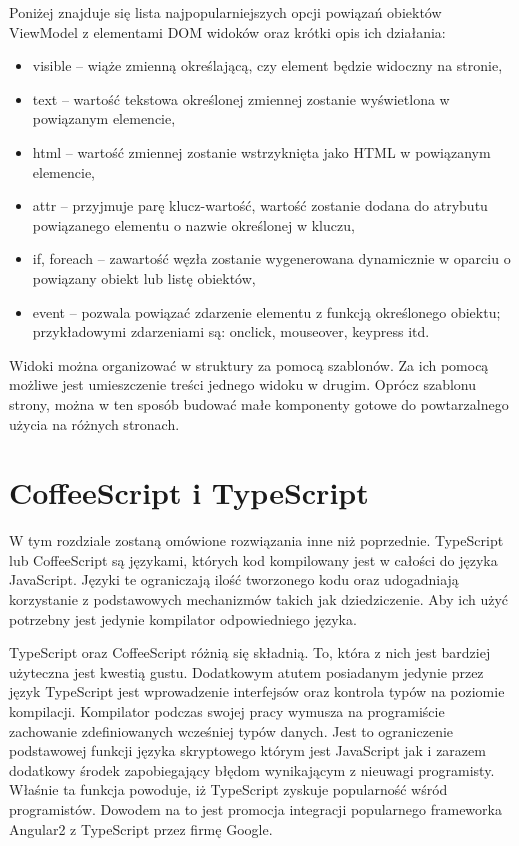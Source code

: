 Poniżej znajduje się lista najpopularniejszych opcji powiązań obiektów ViewModel z elementami DOM widoków oraz krótki opis ich działania:

\begin{itemize}
\item visible -- wiąże zmienną określającą, czy element będzie widoczny na stronie,
\item text -- wartość tekstowa określonej zmiennej zostanie wyświetlona w powiązanym elemencie,
\item html -- wartość zmiennej zostanie wstrzyknięta jako HTML w powiązanym elemencie,
\item attr -- przyjmuje parę klucz-wartość, wartość zostanie dodana do atrybutu powiązanego elementu o nazwie określonej w kluczu,
\item if, foreach -- zawartość węzła zostanie wygenerowana dynamicznie w oparciu o powiązany obiekt lub listę obiektów,
\item event -- pozwala powiązać zdarzenie elementu z funkcją określonego obiektu; przykładowymi zdarzeniami są: onclick, mouseover, keypress itd.
\end{itemize}

Widoki można organizować w struktury za pomocą szablonów. Za ich pomocą możliwe jest umieszczenie treści jednego widoku w drugim. Oprócz szablonu strony, można w ten sposób budować małe komponenty gotowe do powtarzalnego użycia na różnych stronach.


\section{CoffeeScript i TypeScript}
W tym rozdziale zostaną omówione rozwiązania inne niż poprzednie. TypeScript lub CoffeeScript są językami, których kod kompilowany jest w całości do języka JavaScript\cite{typescript-book}. Języki te ograniczają ilość tworzonego kodu oraz udogadniają korzystanie z podstawowych mechanizmów takich jak dziedziczenie. Aby ich użyć potrzebny jest jedynie kompilator odpowiedniego języka.

TypeScript oraz CoffeeScript różnią się składnią. To, która z nich jest bardziej użyteczna jest kwestią gustu. Dodatkowym atutem posiadanym jedynie przez język TypeScript jest wprowadzenie interfejsów oraz kontrola typów na poziomie kompilacji. Kompilator podczas swojej pracy wymusza na programiście zachowanie zdefiniowanych wcześniej typów danych. Jest to ograniczenie podstawowej funkcji języka skryptowego którym jest JavaScript jak i zarazem dodatkowy środek zapobiegający błędom wynikającym z nieuwagi programisty. Właśnie ta funkcja powoduje, iż TypeScript zyskuje popularność wśród programistów. Dowodem na to jest promocja integracji popularnego frameworka Angular2 z TypeScript przez firmę Google\cite{angular2-site}.

